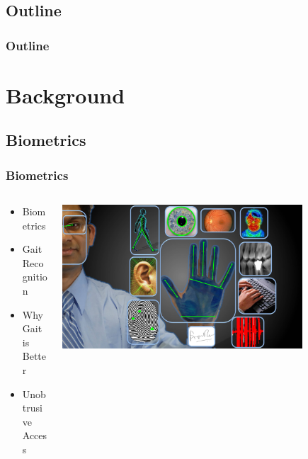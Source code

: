 \documentclass{beamer}
\begin{document}
\subsection*{Outline}

\begin{frame}
  \frametitle{Outline}
  \tableofcontents[hideallsubsections]
\end{frame}





\section[Mobile Security]{Background}

\subsection{Biometrics}
\begin{frame}
  \frametitle{Biometrics}

  \begin{columns}
  \begin{column}{0.4\textwidth}
  \begin{itemize}
    \item Biometrics 
  	\linebreak
  	\item Gait Recognition
  	\linebreak
	\item Why Gait is Better
	\linebreak
	\item Unobtrusive Access
  \end{itemize}
  \end{column}
  \begin{column}{0.8\textwidth}
   \includegraphics[width=0.8\textwidth]{Illustrations/allbiometrics.jpg}
  \end{column}
  \end{columns}
\end{frame}
\end{document}
